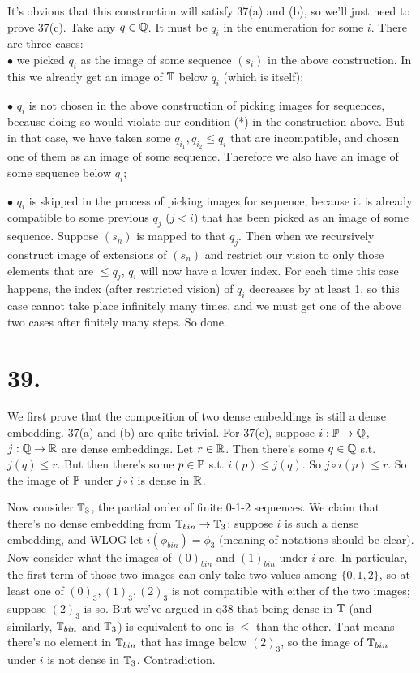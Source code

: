 \documentclass[a4paper]{article}
\begin{document}
It's obvious that this construction will satisfy 37(a) and (b), so we'll just need to prove 37(c). Take any $q \in \Q$. It must be $q_i$ in the enumeration for some $i$. There are three cases:\\
$\bullet$ we picked $q_i$ as the image of some sequence $(s_i)$ in the above construction. In this we already get an image of $\T$ below $q_i$ (which is itself);

$\bullet$ $q_i$ is not chosen in the above construction of picking images for sequences, because doing so would violate our condition (*) in the construction above. But in that case, we have taken some $q_{i_1},q_{i_2} \leq q_i$ that are incompatible, and chosen one of them as an image of some sequence. Therefore we also have an image of some sequence below $q_i$;

$\bullet$ $q_i$ is skipped in the process of picking images for sequence, because it is already compatible to some previous $q_j$ ($j<i$) that has been picked as an image of some sequence. Suppose $(s_n)$ is mapped to that $q_j$. Then when we recursively construct image of extensions of $(s_n)$ and restrict our vision to only those elements that are $\leq q_j$, $q_i$ will now have a lower index. For each time this case happens, the index (after restricted vision) of $q_i$ decreases by at least 1, so this case cannot take place infinitely many times, and we must get one of the above two cases after finitely many steps. So done.

\section*{39.}
We first prove that the composition of two dense embeddings is still a dense embedding. 37(a) and (b) are quite trivial. For 37(c), suppose $i:\P \to \Q$, $j:\Q \to \R$ are dense embeddings. Let $r \in \R$. Then there's some $q \in \Q$ s.t. $j(q) \leq r$. But then there's some $p \in \P$ s.t. $i(p) \leq j(q)$. So $j\circ i(p) \leq r$. So the image of $\P$ under $j \circ i$ is dense in $\R$.

Now consider $\T_3$, the partial order of finite 0-1-2 sequences. We claim that there's no dense embedding from $\T_{bin} \to \T_3$: suppose $i$ is such a dense embedding, and WLOG let $i(\phi_{bin}) = \phi_3$ (meaning of notations should be clear). Now consider what the images of $(0)_{bin}$ and $(1)_{bin}$ under $i$ are. In particular, the first term of those two images can only take two values among $\{0,1,2\}$, so at least one of $(0)_3,(1)_3,(2)_3$ is not compatible with either of the two images; suppose $(2)_3$ is so. But we've argued in q38 that being dense in $\T$ (and similarly, $\T_{bin}$ and $\T_3$) is equivalent to one is $\leq$ than the other. That means there's no element in $\T_{bin}$ that has image below $(2)_3$, so the image of $\T_{bin}$ under $i$ is not dense in $\T_3$. Contradiction.
\end{document}
